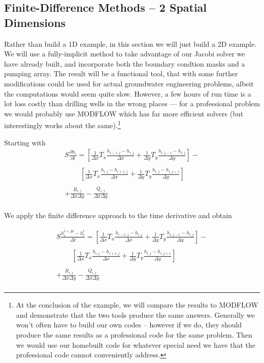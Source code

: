 \subsection{Finite-Difference Methods -- 2 Spatial Dimensions}
Rather than build a 1D example, in this section we will just build a 2D example.  
We will use a fully-implicit method to take advantage of our Jacobi solver we have already built, and incorporate both the boundary condtion masks and a pumping array. 
The result will be a functional tool, that with some further modifications could be used for actual groundwater engineering problems, albeit the computations would seem quite slow. 
However, a few hours of run time is a lot loss costly than drilling wells in the wrong places --- for a professional problem we would probably use MODFLOW which has far more efficient solvers (but interestingly works about the same).\footnote{At the conclusion of the example, we will compare the results to MODFLOW and demonstrate that the two tools produce the same answers.  Generally we won't often have to build our own codes -- however if we do, they should produce the same results as a professional code for the same problem.  Then we would use our homebuilt code for whatever special need we have that the professional code cannot conveniently address.}

Starting with
\begin{equation}
\begin{matrix}
S \frac{\partial h_i}{\partial t} = 
[\frac{1}{\Delta x} T_{x} \frac{h_{i-1,j} - h_{i,j}}{\Delta x} +
 \frac{1}{\Delta y} T_{y} \frac{h_{i,j-1} - h_{i,j}}{\Delta y}] - \\
~~~~~~~~~~\\
~~~~~~~~~~[ \frac{1}{\Delta x} T_{x}  \frac{h_{i,j} - h_{i+1,j}}{\Delta x} +
  \frac{1}{\Delta y}  T_{y} \frac{h_{i,j} - h_{i,j+1}}{\Delta y} ]  \\
  ~~~~~~~\\
  + \frac{R_{i,j}}{\Delta x \Delta y} - \frac{Q_{i,j}}{\Delta x \Delta y} \\     
\end{matrix}        
\end{equation}

We apply the finite difference approach to the time derivative and obtain

\begin{equation}
\begin{matrix}
S \frac{h_i^{t+\Delta t}-h_i^{t}}{\Delta t} = 
[\frac{1}{\Delta x} T_{x} \frac{h_{i-1,j} - h_{i,j}}{\Delta x} +
 \frac{1}{\Delta y} T_{y} \frac{h_{i,j-1} - h_{i,j}}{\Delta y}] - \\
~~~~~~~~~~\\
~~~~~~~~~~[ \frac{1}{\Delta x} T_{x}  \frac{h_{i,j} - h_{i+1,j}}{\Delta x} +
  \frac{1}{\Delta y}  T_{y} \frac{h_{i,j} - h_{i,j+1}}{\Delta y} ]  \\
  ~~~~~~~\\
  + \frac{R_{i,j}}{\Delta x \Delta y} - \frac{Q_{i,j}}{\Delta x \Delta y} \\     
\end{matrix}        
\end{equation}


